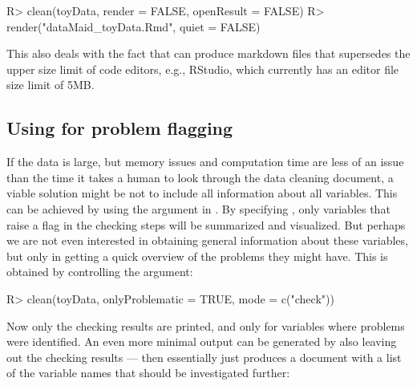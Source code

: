 \documentclass[article,shortnames]{jss}
\newcommand{\hl}[1]{\textcolor{magenta}{#1}}
\begin{document}
\begin{Schunk}
\begin{Sinput}
R> clean(toyData, render = FALSE, openResult = FALSE)
R> render("dataMaid_toyData.Rmd", quiet = FALSE)
\end{Sinput}
\end{Schunk}

This also deals with the fact that  can produce
 markdown files that supersedes the upper size limit of code editors, e.g.,
RStudio, which currently has an editor file size limit of 5MB. %

\subsection[Using dataMaid for problem flagging]{Using  for problem flagging}
If the data is large, but memory issues and computation time are less
of an issue than the time it takes a human to look through the data
cleaning document, a viable solution might be not to include all
information about all variables. %
This can be achieved by using the  argument in
. By specifying , only
variables that raise a flag in the checking steps will be summarized
and visualized. But perhaps we are not even interested in obtaining
general information about these variables, but only in getting a quick
overview of the problems they might have. This is obtained by
controlling the  argument:

\begin{Schunk}
\begin{Sinput}
R> clean(toyData, onlyProblematic = TRUE, mode = c("check"))
\end{Sinput}
\end{Schunk}

Now only the checking results are printed, and only for variables
where problems were identified. An even more minimal output can be
generated by also leaving out the checking results --- then
 essentially just produces a document with a list of the variable names
that should be investigated further:
\end{document}
